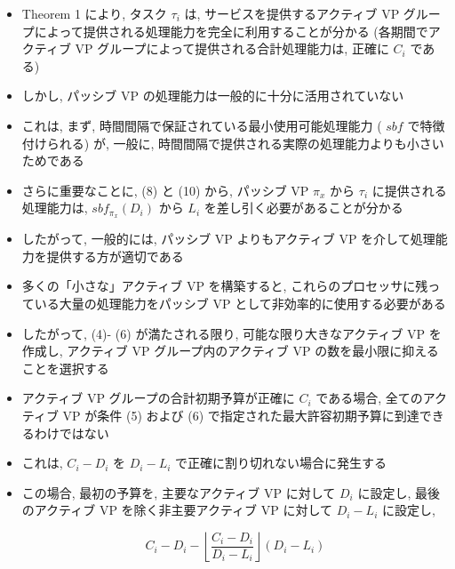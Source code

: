\begin{frame}{}
    \begin{itemize}
        \item Theorem 1 により, タスク $\tau_{i}$ は, サービスを提供するアクティブ VP グループによって提供される処理能力を完全に利用することが分かる (各期間でアクティブ VP グループによって提供される合計処理能力は, 正確に $C_{i}$ である)
\item しかし, パッシブ VP の処理能力は一般的に十分に活用されていない
\item これは, まず, 時間間隔で保証されている最小使用可能処理能力 ( $s b f$ で特徴付けられる) が, 一般に, 時間間隔で提供される実際の処理能力よりも小さいためである
\item さらに重要なことに, (8) と (10) から, パッシブ VP $\pi_{x}$ から $\tau_{i}$ に提供される処理能力は, $s b f_{\pi_{x}}\left(D_{i}\right)$ から $L_{i}$ を差し引く必要があることが分かる
\item したがって, 一般的には, パッシブ VP よりもアクティブ VP を介して処理能力を提供する方が適切である
\item 多くの「小さな」アクティブ VP を構築すると, これらのプロセッサに残っている大量の処理能力をパッシブ VP として非効率的に使用する必要がある
\item したがって, (4)- (6) が満たされる限り, 可能な限り大きなアクティブ VP を作成し, アクティブ VP グループ内のアクティブ VP の数を最小限に抑えることを選択する
    \end{itemize}
\end{frame}

\begin{frame}{}
    \begin{itemize}
        \item アクティブ VP グループの合計初期予算が正確に $C_{i}$ である場合, 全てのアクティブ VP が条件 (5) および (6) で指定された最大許容初期予算に到達できるわけではない
\item これは, $C_{i}-D_{i}$ を $D_{i}-L_{i}$ で正確に割り切れない場合に発生する
\item この場合, 最初の予算を, 主要なアクティブ VP に対して $D_{i}$ に設定し, 最後のアクティブ VP を除く非主要アクティブ VP に対して $D_{i}-L_{i}$ に設定し,

              \begin{equation*}
                  C_{i}-D_{i}-\left\lfloor\frac{C_{i}-D_{i}}{D_{i}-L_{i}}\right\rfloor\left(D_{i}-L_{i}\right)
              \end{equation*}
    \end{itemize}
\end{frame}

